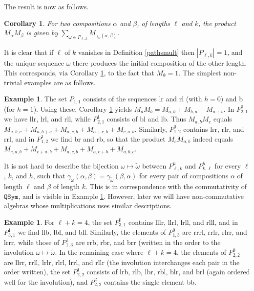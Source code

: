 \documentclass{article}
\newtheorem{cor}[thm]{Corollary}
\theoremstyle{definition}
\newtheorem{ex}[thm]{Example}
\begin{document}
The result is now as follows.
\begin{cor}
For two compositions $\alpha$ and $\beta$, of lengths $\ell$ and $k$, the product $M_{\alpha}M_{\beta}$ is given by $\sum_{\omega \in P_{\ell,k}}M_{\gamma_{\omega}(\alpha,\beta)}$. \label{prodMs}
\end{cor}
It is clear that if $\ell$ of $k$ vanishes in Definition \ref{pathsmult} then $|P_{\ell,k}|=1$, and the unique sequence $\omega$ there produces the initial composition of the other length. This corresponds, via Corollary \ref{prodMs}, to the fact that $M_{\emptyset}=1$. The simplest non-trivial examples are as follows.
\begin{ex}
The set $P_{1,1}$ consists of the sequences lr and rl (with $h=0$) and b (for $h=1$). Using these, Corollary \ref{prodMs} yields $M_{a}M_{b}=M_{a,b}+M_{b,a}+M_{a+b}$. In $P_{2,1}^{0}$ we have llr, lrl, and rll, while $P_{2,1}^{1}$ consists of bl and lb. Thus $M_{a,b}M_{c}$ equals $M_{a,b,c}+M_{a,b+c}+M_{a,c,b}+M_{a+c,b}+M_{c,a,b}$. Similarly, $P_{1,2}^{0}$ contains lrr, rlr, and rrl, and in $P_{1,2}^{1}$ we find br and rb, so that the product $M_{c}M_{a,b}$ indeed equals $M_{c,a,b}+M_{c+a,b}+M_{a,c,b}+M_{a,c+b}+M_{a,b,c}$. \label{pathex}
\end{ex}
It is not hard to describe the bijection $\omega\mapsto\tilde{\omega}$ between $P_{\ell,k}^{h}$ and $P_{k,\ell}^{h}$ for every $\ell$, $k$, and $h$, such that $\gamma_{\omega}(\alpha,\beta)=\gamma_{\tilde{\omega}}(\beta,\alpha)$ for every pair of compositions $\alpha$ of length $\ell$ and $\beta$ of length $k$. This is in correspondence with the commutativity of $\mathtt{QSym}$, and is visible in Example \ref{pathex}. However, later we will have non-commutative algebras whose multiplications uses similar descriptions.
\begin{ex}
For $\ell+k=4$, the set $P_{3,1}^{0}$ contains lllr, llrl, lrll, and rlll, and in $P_{3,1}^{1}$ we find llb, lbl, and bll. Similarly, the elements of $P_{1,3}^{0}$ are rrrl, rrlr, rlrr, and lrrr, while those of $P_{1,3}^{1}$ are rrb, rbr, and brr (written in the order to the involution $\omega\mapsto\tilde{\omega}$. In the remaining case where $\ell+k=4$, the elements of $P_{2,2}^{0}$ are llrr, rrll, lrlr, rlrl, lrrl, and rllr (the involution interchanges each pair in the order written), the set $P_{2,2}^{1}$ consists of lrb, rlb, lbr, rbl, blr, and brl (again ordered well for the involution), and $P_{2,2}^{2}$ contains the single element bb. \label{expath}
\end{ex}
\end{document}
